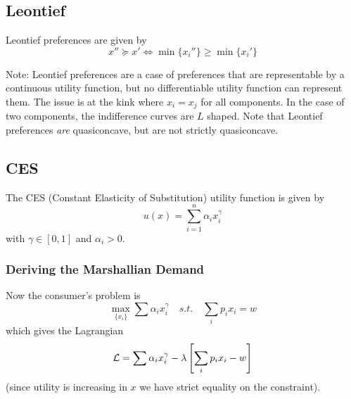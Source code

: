\subsection{Leontief}
\label{sec:leontif}

\begin{definition}
  Leontief preferences are given by
  \[
  x'' \succeq x' \iff \min\{x_i''\} \geq \min\{x_i'\}
  \]
\end{definition}

Note: Leontief preferences are a case of preferences that are
representable by a continuous utility function, but no differentiable
utility function can represent them. The issue is at the kink where
$x_i = x_j$ for all components. In the case of two components, the
indifference curves are $L$ shaped. Note that Leontief preferences
\textit{are} quasiconcave, but are not strictly quasiconcave.


\subsection{CES}
\label{sec:ces}

\begin{definition}
  The CES (Constant Elasticity of Substitution) utility function is given by
  \[
  u(x) = \sum_{i=1}^n \alpha_i x_i^\gamma
  \]
  with $\gamma \in [0,1]$ and $\alpha_i > 0$.
\end{definition}

\subsubsection{Deriving the Marshallian Demand}

Now the consumer's problem is 
\[
\max_{\{x_i\}} \sum \alpha_i x_i^\gamma \quad s.t. \quad \sum_i p_i x_i = w
\]
which gives the Lagrangian
\[
{\cal L} = \sum \alpha_i x_i^\gamma - \lambda\left[\sum_i p_ix_i - w\right]
\]
(since utility is increasing in $x$ we have strict equality on the
constraint).


